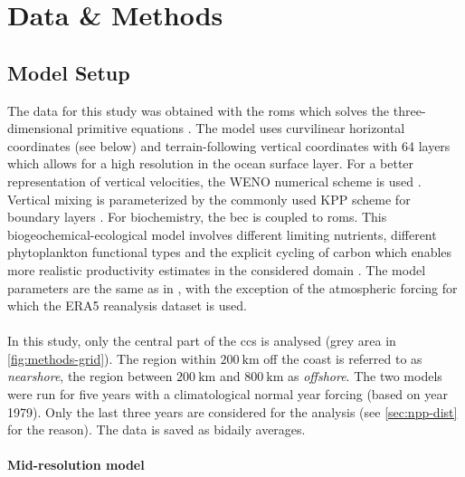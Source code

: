 \chapter{Data \& Methods}\label{sec:data-methods}

\section{Model Setup}\label{sec:data-methods-model}

The data for this study was obtained with the \ac{roms} which solves the three-dimensional primitive equations \autocite{shchepetkin-2005-roms-orig}. The model uses curvilinear horizontal coordinates (see below) and terrain-following vertical coordinates with 64 layers \autocite{song-1994-roms-terrain-following} which allows for a high resolution in the ocean surface layer. For a better representation of vertical velocities, the WENO numerical scheme is used \autocite{shu-1998-roms-weno, vandemeulebrouck-2020-roms-weno-implementation}. Vertical mixing is parameterized by the commonly used KPP scheme for boundary layers \autocite{large-1994-roms-kpp}. For biochemistry, the \ac{bec} \autocite{moore-2013-roms-bec-orig} is coupled to \ac{roms}. This biogeochemical-ecological model involves different limiting nutrients, different phytoplankton functional types and the explicit cycling of carbon which enables more realistic productivity estimates in the considered domain \autocite{frischknecht-2017-roms-bec-parameters}. The model parameters are the same as in \textcite{frischknecht-2018-3dpump}, with the exception of the atmospheric forcing for which the ERA5 reanalysis dataset \autocite{roms-era5} is used.\\
\\
In this study, only the central part of the \ac{ccs} is analysed (grey area in \autoref{fig:methods-grid}). The region within $\SI{200}{\kilo\metre}$ off the coast is referred to as \textit{nearshore}, the region between $\SI{200}{\kilo\metre}$ and $\SI{800}{\kilo\metre}$ as \textit{offshore}. The two models were run for five years with a climatological normal year forcing (based on year 1979). Only the last three years are considered for the analysis (see \autoref{sec:npp-dist} for the reason). The data is saved as bidaily averages.

\subsubsection{Mid-resolution model}

